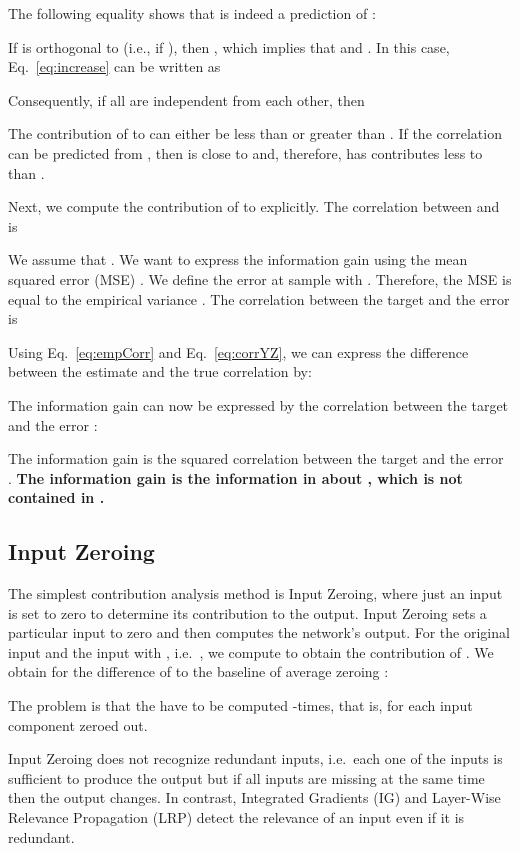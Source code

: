 \documentclass{article}
\begin{document}
\begin{appendices}
The following equality shows
that  is indeed a
prediction of :


If  is orthogonal to 
(i.e., if ), then , which implies
that  and . In this case,
Eq.~\eqref{eq:increase} can be written as

Consequently, if all  are independent from each other, then

The contribution of  to  can either be less than or
greater than .
If the correlation  can be predicted from , then
 is close to  and, therefore,  has
contributes less to  than .

Next, we compute the contribution of  to  explicitly. 
The correlation between  and  is 

We assume that .
We want to express the information gain using the mean squared error (MSE)
.
We define the error  at sample  
with . Therefore,
the MSE is equal to the empirical variance
.
The correlation  between the target  and the
error  is

Using Eq.~\eqref{eq:empCorr} and Eq.~\eqref{eq:corrYZ},
we can express the difference between the estimate  and
the true correlation  by:


The information gain can now be expressed by
the correlation  between the target  and the
error :

The information gain is the squared
correlation  between the target  and the
error .
{\bf The information gain is the information in  about , which is
not contained in .}


                           



\subsection{Input Zeroing}

The simplest contribution analysis method is Input Zeroing, where just
an input is set to zero to determine its contribution to the output.
Input Zeroing sets a particular input  to zero and then computes
the network's output. For the original input  and the input with
, i.e.\ ,
we compute  to obtain the
contribution of . 
We obtain for the difference of  to the baseline
of average zeroing :

The problem is that the  have to be computed -times, that
is, for each input component zeroed out.

Input Zeroing does not recognize redundant inputs, i.e.\ each one of the 
inputs is sufficient 
to produce the output but if all inputs are missing at the same time 
then the output changes. 
In contrast, Integrated Gradients (IG) and Layer-Wise Relevance Propagation (LRP)
detect the relevance of an input even if it is redundant.




\end{appendices}
\end{document}
